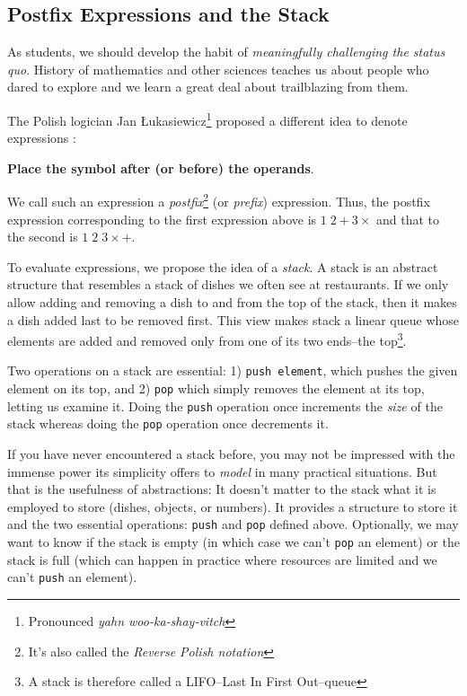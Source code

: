 \documentclass{resonance}
\begin{document}

\subsection{Postfix Expressions and the Stack}
As students, we should develop the habit of \emph{meaningfully challenging the status quo}. History of mathematics and other sciences teaches us about people who dared to explore and we learn a great deal about trailblazing from them.

The Polish logician Jan Łukasiewicz\footnote{Pronounced \emph{yahn woo-ka-shay-vitch}} proposed a different idea to denote expressions \cite{Hamblin1962}: 

\textbf{Place the symbol after (or before) the operands}. 

We call such an expression a \emph{postfix}\footnote{It's also called the \emph{Reverse Polish notation}} (or \emph{prefix}) expression. Thus, the postfix expression corresponding to the first expression above is $1\;2 + 3\times$ and that to the second is $1\;2\;3\times +$. 

To evaluate expressions, we propose the idea of a \emph{stack}. A stack is an abstract structure that resembles a stack of dishes we often see at restaurants. If we only allow adding and removing a dish to and from the top of the stack, then it makes a dish added last to be removed first. This view makes stack a linear queue whose elements are added and removed only from one of its two ends--the top\footnote{A stack is therefore called a LIFO--Last In First Out--queue}. 

Two operations on a stack are essential: 1) \texttt{push element}, which pushes the given element on its top, and 2) \texttt{pop} which simply removes the element at its top, letting us examine it. Doing the \texttt{push} operation once increments the \emph{size} of the stack whereas doing the \texttt{pop} operation once decrements it.

If you have never encountered a stack before, you may not be impressed with the immense power its simplicity offers to \emph{model} in many practical situations. But that is the usefulness of abstractions: It doesn't matter to the stack what it is employed to store (dishes, objects, or numbers). It provides a structure to store it and the two essential operations: \texttt{push} and \texttt{pop} defined above. Optionally, we may want to know if the stack is empty (in which case we can't \texttt{pop} an element) or the stack is full (which can happen in practice where resources are limited and we can't \texttt{push} an element).
\end{document}
